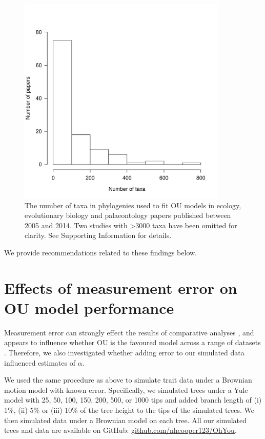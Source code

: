 \documentclass[a4paper,12pt]{article}
\begin{document}
    \begin{figure}[!htbp]
      \centering
      \includegraphics[width=10cm, height=10cm, keepaspectratio=true]{Figures/OhYou_Figure2.pdf}
      \caption{The number of taxa in phylogenies used to fit OU models in ecology, evolutionary biology and palaeontology papers published between 2005 and 2014. Two studies with \textgreater 3000 taxa have been omitted for clarity. See Supporting Information for details.
      }
      \label{figure:ntaxa}
\end{figure} 

    We provide recommendations related to these findings below.

\section{Effects of measurement error on OU model performance}
  Measurement error can strongly effect the results of comparative analyses \citep{silvestro2015}, and appears to influence whether OU is the favoured model across a range of datasets \citep[see][]{pennell2015model}. 
  Therefore, we also investigated whether adding error to our simulated data influenced estimates of $\alpha$.
  
  We used the same procedure as above to simulate trait data under a Brownian motion model with known error. 
  Specifically, we simulated trees under a Yule model with 25, 50, 100, 150, 200, 500, or 1000 tips and added branch length of (i) 1\%, (ii) 5\% or (iii) 10\% of the tree height to the tips of the simulated trees. 
  We then simulated data under a Brownian model on each tree. 
  All our simulated trees and data are available on GitHub: \href{https://github.com/nhcooper123/OhYou}{github.com/nhcooper123/OhYou}.
\end{document}
